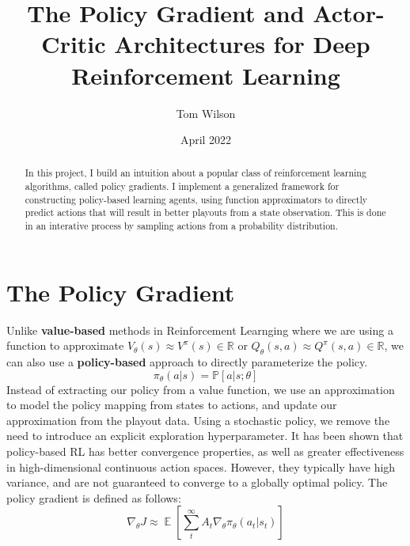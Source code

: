 \documentclass[12pt, letterpaper, twoside]{article}
\title{The Policy Gradient and Actor-Critic Architectures for Deep Reinforcement Learning}
\author{Tom Wilson}
\date{April 2022}
\begin{document}
\maketitle

\begin{abstract}
	In this project, I build an intuition about a popular class of reinforcement learning algorithms, called policy gradients.
	I implement a generalized framework for constructing policy-based learning agents, using function approximators to directly predict actions that will result in better playouts from a state observation. This is done in an interative process by sampling actions from a probability distribution. 
\end{abstract}

\section{The Policy Gradient}
	Unlike \textbf{value-based} methods in Reinforcement Learnging where we are using a function to approximate $V_\theta(s) \approx V^\pi(s) \in \mathbb{R}$ or $Q_\theta(s, a) \approx Q^\pi(s, a) \in \mathbb{R}$, we can also use a \textbf{policy-based} approach to directly parameterize the policy. 
	\[ \pi_\theta(a|s) = \mathbb{P}[a|s; \theta]\] 
	Instead of extracting our policy from a value function, we use an approximation to model the policy mapping from states to actions, and update our approximation from the playout data. Using a stochastic policy, we remove the need to introduce an explicit exploration hyperparameter. It has been shown that policy-based RL has better convergence properties, as well as greater effectiveness in high-dimensional continuous action spaces. However, they typically have high variance, and are not guaranteed to converge to a globally optimal policy. The policy gradient is defined as follows:
	\[\nabla_\theta J \approx \mathop{\mathbb{E}}[\sum_{t}^{\infty}A_t \nabla_\theta \pi_\theta(a_t|s_t)]\]
\end{document}
